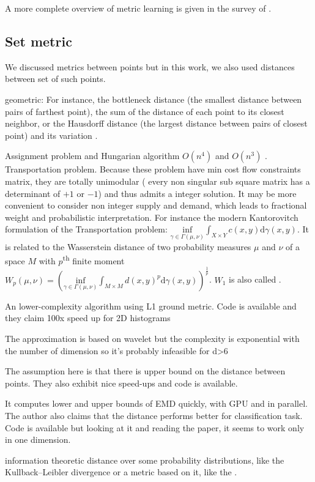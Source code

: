 A more complete overview of metric learning is given in the survey of
\textcite{MetricSurvey13}.

\subsection{Set metric} We discussed metrics between points but in this work,
we also used distances between set of such points.

geometric: For instance, the bottleneck distance \autocite{Bottleneck96} (the
smallest distance between pairs of farthest point), the sum of the distance of
each point to its closest neighbor, or the Hausdorff distance (the largest
distance between pairs of closest point) and its variation
\autocite{ModifiedHausdorff94}.

Assignment problem and Hungarian algorithm $O(n^4)$ and $O(n^3)$
\autocite{Hungarian57}. Transportation problem. Because these problem have min
cost flow constraints matrix, they are totally unimodular (\ie{} every non
singular sub square matrix has a determinant of $+1$ or $-1$) and thus admits
a integer solution.  It may be more convenient to consider non integer supply
and demand, which leads to fractional weight and probabilistic interpretation.
For instance the modern Kantorovitch formulation of the Transportation
problem: $\underset{\gamma \in \Gamma(\mu, \nu)}{\mathrm{inf}} \int_{X\times
Y} c(x,y)\mathrm{d}\gamma(x,y)$. It is related to the Wasserstein distance of
two probability measures $\mu$ and $\nu$ of a space $M$ with
$p$\textsuperscript{th} finite moment $W_p(\mu, \nu) = \left( \underset{\gamma
\in \Gamma(\mu, \nu)}{\mathrm{inf}} \int_{M\times M}
d(x,y)^p\mathrm{d}\gamma(x,y)\right)^{\frac{1}{p}}$. $W_1$ is also called
 \autocite{EMD98}.


An lower-complexity algorithm using L1 ground metric. Code is available and
they claim 100x speed up for 2D histograms \autocite{Ling2007}

The approximation is based on wavelet but the complexity is exponential with
the number of dimension so it's probably infeasible for d>6
\autocite{Shirdhonkar2008}

The assumption here is that there is upper bound on the distance between
points. They also exhibit nice speed-ups and code is available.
\autocite{Pele2009}

It computes lower and upper bounds of EMD quickly, with GPU and in parallel.
The author also claims that the distance performs better for classification
task. Code is available but looking at it and reading the paper, it seems to
work only in one dimension. \autocite{FastEMD13}


information theoretic distance over some probability distributions, like the
Kullback--Leibler divergence or a metric based on it, like the
 \autocite{JensenShannon03}.
